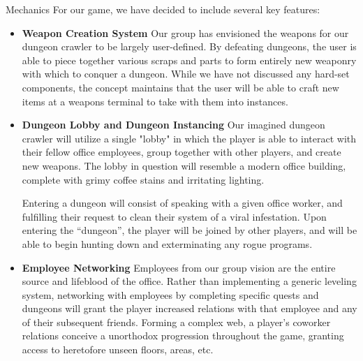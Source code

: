 \documentclass[12pt]{report}
\begin{document}
\begin{section}{Mechanics}
For our game, we have decided to include several key features:
\begin{itemize}
\item \textbf{Weapon Creation System}\newline
	Our group has envisioned the weapons for our dungeon crawler to be 
	largely user-defined. By defeating dungeons, the user is able to piece 
	together various scraps and parts to form entirely new weaponry with 
	which to conquer a dungeon. While we have not discussed any hard-set 
	components, the concept maintains that the user will be able to craft 
	new items at a weapons terminal to take with them into instances.
	
\item \textbf{Dungeon Lobby and Dungeon Instancing}\newline
	Our imagined dungeon crawler will utilize a single "lobby" in which the 
	player is able to interact with their fellow office employees, group 
	together with other players, and create new weapons. The lobby in question 
	will resemble a modern office building, complete with grimy coffee stains 
	and irritating lighting.
	
	Entering a dungeon will consist of speaking with a given office worker, 
	and fulfilling their request to clean their system of a viral infestation. 
	Upon entering the ``dungeon'', the player will be joined by other players, 
	and will be able to begin hunting down and exterminating any rogue programs.
	
\item \textbf{Employee Networking}\newline
	Employees from our group vision are the entire source and lifeblood of the 
	office. Rather than implementing a generic leveling system, networking 
	with employees by completing specific quests and dungeons will grant the 
	player increased relations with that employee and any of their subsequent 
	friends. Forming a complex web, a player's coworker relations conceive a 
	unorthodox progression throughout the game, granting access to heretofore 
	unseen floors, areas, etc.
	
\end{itemize}
\end{section}
\end{document}
